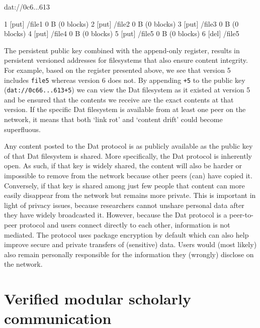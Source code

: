 \documentclass[publications,article,submit,moreauthors,pdftex,10pt,a4paper]{Definitions/mdpi}
\newenvironment{Shaded}{\begin{snugshade}}{\end{snugshade}}
\newcommand{\ExtensionTok}[1]{#1}
\newcommand{\NormalTok}[1]{#1}
\begin{document}
\begin{Shaded}
\begin{Highlighting}[]
\ExtensionTok{dat}\NormalTok{://0c6...613}

\ExtensionTok{1}\NormalTok{ [put] /file1 0 B (0 blocks)}
\ExtensionTok{2}\NormalTok{ [put] /file2 0 B (0 blocks)}
\ExtensionTok{3}\NormalTok{ [put] /file3 0 B (0 blocks)}
\ExtensionTok{4}\NormalTok{ [put] /file4 0 B (0 blocks)}
\ExtensionTok{5}\NormalTok{ [put] /file5 0 B (0 blocks)}
\ExtensionTok{6}\NormalTok{ [del] /file5}
\end{Highlighting}
\end{Shaded}

The persistent public key combined with the append-only register,
results in persistent versioned addresses for filesystems that also
ensure content integrity. For example, based on the register presented
above, we see that version 5 includes \texttt{file5} whereas version 6
does not. By appending \texttt{+5} to the public key
(\texttt{dat://0c66...613+5}) we can view the Dat filesystem as it
existed at version 5 and be ensured that the contents we receive are the
exact contents at that version. If the specific Dat filesystem is
available from at least one peer on the network, it means that both
`link rot' and `content drift' \citep{doi:10.1371/journal.pone.0115253, doi:10.1371/journal.pone.0167475}
could become superfluous.

Any content posted to the Dat protocol is as publicly available as the public key of that Dat filesystem is shared. More specifically, the Dat protocol is inherently open. As such, if that key is widely shared, the content will also be harder or impossible to remove from the network because other peers (can) have copied it. Conversely, if that key is shared among just few people that content can more easily disappear from the network but remains more private. This is important in light of privacy issues, because researchers cannot unshare personal data after they have widely broadcasted it. However, because the Dat protocol is a peer-to-peer protocol and users connect directly to each other, information is not mediated. The protocol uses package encryption by default which can also help improve secure and private transfers of (sensitive) data. Users would (most likely) also remain personally responsible for the information they (wrongly) disclose on the network.

\section*{Verified modular scholarly
communication}\label{verified-modular-scholarly-communication}
\end{document}
